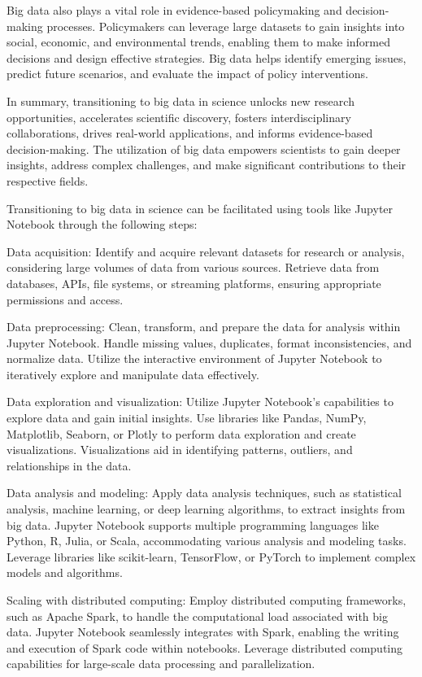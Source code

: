 Big data also plays a vital role in evidence-based policymaking and decision-making processes.
Policymakers can leverage large datasets to gain insights into social, economic, and environmental trends, enabling them to make informed decisions and design effective strategies.
Big data helps identify emerging issues, predict future scenarios, and evaluate the impact of policy interventions.

In summary, transitioning to big data in science unlocks new research opportunities, accelerates scientific discovery, fosters interdisciplinary collaborations, drives real-world applications, and informs evidence-based decision-making. The utilization of big data empowers scientists to gain deeper insights, address complex challenges, and make significant contributions to their respective fields.


Transitioning to big data in science can be facilitated using tools like Jupyter Notebook through the following steps:

    Data acquisition: Identify and acquire relevant datasets for research or analysis, considering large volumes of data from various sources. Retrieve data from databases, APIs, file systems, or streaming platforms, ensuring appropriate permissions and access.

    Data preprocessing: Clean, transform, and prepare the data for analysis within Jupyter Notebook. Handle missing values, duplicates, format inconsistencies, and normalize data. Utilize the interactive environment of Jupyter Notebook to iteratively explore and manipulate data effectively.

    Data exploration and visualization: Utilize Jupyter Notebook's capabilities to explore data and gain initial insights. Use libraries like Pandas, NumPy, Matplotlib, Seaborn, or Plotly to perform data exploration and create visualizations. Visualizations aid in identifying patterns, outliers, and relationships in the data.

    Data analysis and modeling: Apply data analysis techniques, such as statistical analysis, machine learning, or deep learning algorithms, to extract insights from big data. Jupyter Notebook supports multiple programming languages like Python, R, Julia, or Scala, accommodating various analysis and modeling tasks. Leverage libraries like scikit-learn, TensorFlow, or PyTorch to implement complex models and algorithms.

    Scaling with distributed computing: Employ distributed computing frameworks, such as Apache Spark, to handle the computational load associated with big data. Jupyter Notebook seamlessly integrates with Spark, enabling the writing and execution of Spark code within notebooks. Leverage distributed computing capabilities for large-scale data processing and parallelization.

